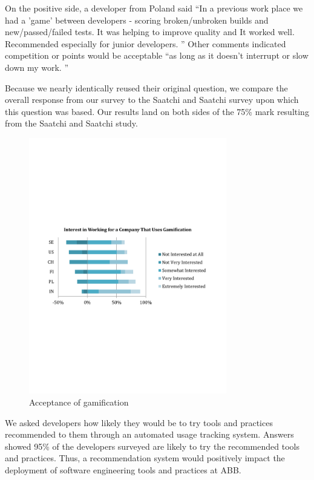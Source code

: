 \documentclass{sig-alternate}
\begin{document}
On the positive side, a developer from Poland said ``In a previous work place we had a 'game' between developers - scoring broken/unbroken builds and new/passed/failed tests. It was helping to improve quality and It worked well. Recommended especially for junior developers. ''  Other comments indicated competition or points would be acceptable ``as long as it doesn't interrupt or slow down my work. ''

Because we nearly identically reused their original question, we compare the overall response from our survey to the Saatchi and Saatchi survey\cite{wbsnipes:SaatchiGameification} upon which this question was based.  Our results land on both sides of the 75\% mark resulting from the Saatchi and Saatchi study.  

\begin{figure}
	\includegraphics[width=3.4in]{gamificationquestion.pdf}
	\caption{Acceptance of gamification}
	\label{fig:gamification}
\end{figure}

We asked developers how likely they would be to try tools and practices recommended to them through an automated usage tracking system.  Answers showed 95\% of the developers surveyed are likely to try the recommended tools and practices.  Thus, a recommendation system would positively impact the deployment of software engineering tools and practices at ABB.
\end{document}
